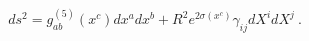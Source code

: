 \begin{equation}
    \label{5dreduct}
    ds^2=g^{(5)}_{ab}(x^c)dx^a dx^b+
    R^2 e^{2\sigma(x^c)} \gamma_{ij}dX^idX^j ~.
\end{equation}

